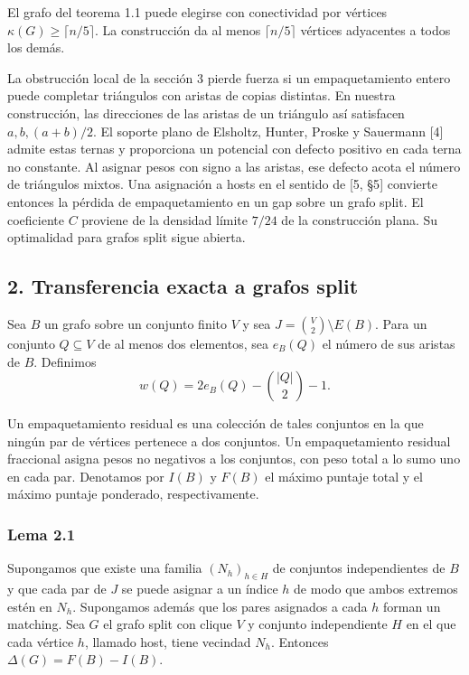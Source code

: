 \documentclass[spanish,11pt,a4paper]{article}
\begin{document}
El grafo del teorema 1.1 puede elegirse con conectividad por vértices \(\kappa(G)\ge\lceil n/5\rceil\). La construcción da al menos \(\lceil n/5\rceil\) vértices adyacentes a todos los demás.

La obstrucción local de la sección 3 pierde fuerza si un empaquetamiento entero puede completar triángulos con aristas de copias distintas. En nuestra construcción, las direcciones de las aristas de un triángulo así satisfacen \(a,b,(a+b)/2\). El soporte plano de Elsholtz, Hunter, Proske y Sauermann {[}4{]} admite estas ternas y proporciona un potencial con defecto positivo en cada terna no constante. Al asignar pesos con signo a las aristas, ese defecto acota el número de triángulos mixtos. Una asignación a hosts en el sentido de {[}5, §5{]} convierte entonces la pérdida de empaquetamiento en un gap sobre un grafo split. El coeficiente \(C\) proviene de la densidad límite \(7/24\) de la construcción plana. Su optimalidad para grafos split sigue abierta.

\subsection{2. Transferencia exacta a grafos split}\label{transferencia-exacta-a-grafos-split}

Sea \(B\) un grafo sobre un conjunto finito \(V\) y sea \(J=\binom V2\setminus E(B)\). Para un conjunto \(Q\subseteq V\) de al menos dos elementos, sea \(e_B(Q)\) el número de sus aristas de \(B\). Definimos
\[w(Q)=2e_B(Q)-\binom{|Q|}{2}-1.\]

Un empaquetamiento residual es una colección de tales conjuntos en la que ningún par de vértices pertenece a dos conjuntos. Un empaquetamiento residual fraccional asigna pesos no negativos a los conjuntos, con peso total a lo sumo uno en cada par. Denotamos por \(I(B)\) y \(F(B)\) el máximo puntaje total y el máximo puntaje ponderado, respectivamente.

\subsubsection{Lema 2.1}\label{lema-2.1}

Supongamos que existe una familia \((N_h)_{h\in H}\) de conjuntos independientes de \(B\) y que cada par de \(J\) se puede asignar a un índice \(h\) de modo que ambos extremos estén en \(N_h\). Supongamos además que los pares asignados a cada \(h\) forman un matching. Sea \(G\) el grafo split con clique \(V\) y conjunto independiente \(H\) en el que cada vértice \(h\), llamado host, tiene vecindad \(N_h\). Entonces \(\Delta(G)=F(B)-I(B)\).
\end{document}
